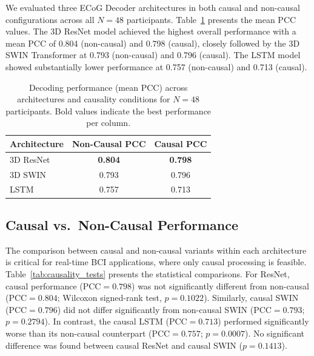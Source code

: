 \documentclass[11pt]{article}
\begin{document}
We evaluated three ECoG Decoder architectures in both causal and non-causal configurations across all $N=48$ participants. Table~\ref{tab:model_comparison} presents the mean PCC values. The 3D ResNet model achieved the highest overall performance with a mean PCC of 0.804 (non-causal) and 0.798 (causal), closely followed by the 3D SWIN Transformer at 0.793 (non-causal) and 0.796 (causal). The LSTM model showed substantially lower performance at 0.757 (non-causal) and 0.713 (causal).

\begin{table}[H]
\centering
\caption{Decoding performance (mean PCC) across architectures and causality conditions for $N=48$ participants. Bold values indicate the best performance per column.}
\label{tab:model_comparison}
\begin{tabular}{lcc}
\toprule
\textbf{Architecture} & \textbf{Non-Causal PCC} & \textbf{Causal PCC} \\
\midrule
3D ResNet  & \textbf{0.804} & \textbf{0.798} \\
3D SWIN    & 0.793          & 0.796          \\
LSTM       & 0.757          & 0.713          \\
\bottomrule
\end{tabular}
\end{table}

\subsection{Causal vs.\ Non-Causal Performance}

The comparison between causal and non-causal variants within each architecture is critical for real-time BCI applications, where only causal processing is feasible. Table~\ref{tab:causality_tests} presents the statistical comparisons. For ResNet, causal performance (PCC${}=0.798$) was not significantly different from non-causal (PCC${}=0.804$; Wilcoxon signed-rank test, $p=0.1022$). Similarly, causal SWIN (PCC${}=0.796$) did not differ significantly from non-causal SWIN (PCC${}=0.793$; $p=0.2794$). In contrast, the causal LSTM (PCC${}=0.713$) performed significantly worse than its non-causal counterpart (PCC${}=0.757$; $p=0.0007$). No significant difference was found between causal ResNet and causal SWIN ($p=0.1413$).
\end{document}
